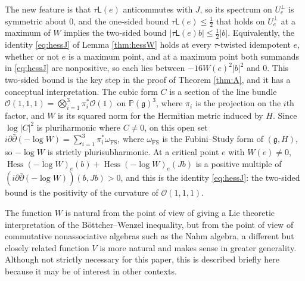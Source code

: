 \documentclass [leqno, 10pt]{amsart}
\theoremstyle{definition}
\numberwithin{equation}{section}
\newcommand{\hess}{\operatorname{Hess}}
\newcommand{\lin}{\mathsf{L}}
\newcommand{\proj}{\mathbb{P}}
\newcommand{\g}{\mathfrak{g}}
\newcommand{\nnorm}[1]{\lvert #1\rvert}%
\newcommand{\Usp}{U}
\newcommand{\Uperp}{\Usp^{\perp}}
\begin{document}
The new feature is that $\tau\lin(e)$ anticommutes with $J$, so its spectrum on $\Uperp_{e}$ is symmetric about $0$, and the one-sided bound $\tau\lin(e) \leq \tfrac{1}{2}$ that holds on $\Uperp_{e}$ at a maximum of $W$ implies the two-sided bound $\nnorm{\tau\lin(e)b} \leq \tfrac{1}{2}\nnorm{b}$. Equivalently, the identity \eqref{eq:hessJ} of Lemma \ref{thm:hessW} holds at every $\tau$-twisted idempotent $e$, whether or not $e$ is a maximum point, and at a maximum point both summands in \eqref{eq:hessJ} are nonpositive, so each lies between $-16W(e)^{2}\nnorm{b}^{2}$ and $0$. This two-sided bound is the key step in the proof of Theorem \ref{thm:A}, and it has a conceptual interpretation. The cubic form $C$ is a section of the line bundle $\mathcal{O}(1, 1, 1) = \bigotimes_{i=1}^{3}\pi_{i}^{\ast}\mathcal{O}(1)$ on $\proj(\g)^{3}$, where $\pi_{i}$ is the projection on the $i$th factor, and $W$ is its squared norm for the Hermitian metric induced by $H$. Since $\log|C|^{2}$ is pluriharmonic where $C \neq 0$, on this open set $i\partial\bar\partial(-\log W) = \sum_{i=1}^{3}\pi_{i}^{\ast}\omega_{\mathrm{FS}}$, where $\omega_{\mathrm{FS}}$ is the Fubini--Study form of $(\g, H)$, so $-\log W$ is strictly plurisubharmonic. At a critical point $e$ with $W(e) \neq 0$, $\hess(-\log W)_{e}(b) + \hess(-\log W)_{e}(Jb)$ is a positive multiple of $(i\partial\bar\partial(-\log W))(b, Jb) > 0$, and this is the identity \eqref{eq:hessJ}: the two-sided bound is the positivity of the curvature of $\mathcal{O}(1, 1, 1)$.

The function $W$ is natural from the point of view of giving a Lie theoretic interpretation of the Böttcher--Wenzel inequality, but from the point of view of commutative nonassociative algebras such as the Nahm algebra, a different but closely related function $V$ is more natural and makes sense in greater generality. Although not strictly necessary for this paper, this is described briefly here because it may be of interest in other contexts.
\end{document}
